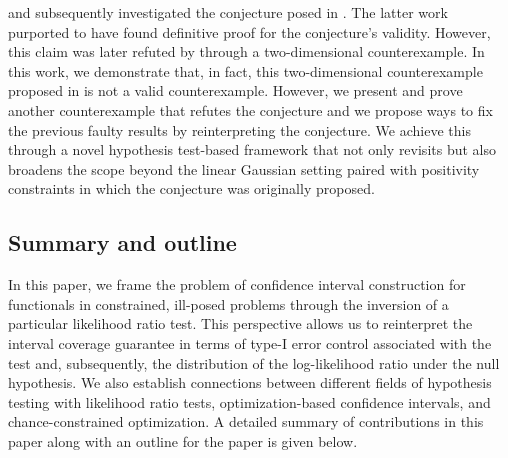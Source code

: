 \documentclass[11pt]{article}
\numberwithin{equation}{section}
\numberwithin{figure}{section}
\begin{document}
\cite{rust_burrus} and subsequently \cite{rust1994confidence} investigated the conjecture posed in \cite{burrus1965utilization}. 
The latter work purported to have found definitive proof for the conjecture's validity. 
However, this claim was later refuted by \cite{tenorio2007confidence} through a two-dimensional counterexample.
In this work, we demonstrate that, in fact, this two-dimensional counterexample proposed in \cite{tenorio2007confidence} is not a valid counterexample. 
However, we present and prove another counterexample that refutes the conjecture and we propose ways to fix the previous faulty results by reinterpreting the conjecture. 
We achieve this through a novel hypothesis test-based framework that not only revisits but also broadens the scope beyond the linear Gaussian setting paired with positivity constraints in which the conjecture was originally proposed.

\subsection{Summary and outline}

In this paper, we frame the problem of confidence interval construction for functionals in constrained, ill-posed problems through the inversion of a particular likelihood ratio test. 
This perspective allows us to reinterpret the interval coverage guarantee in terms of type-I error control associated with the test and, subsequently, the distribution of the log-likelihood ratio under the null hypothesis.
We also establish connections between different fields of hypothesis testing with likelihood ratio tests, optimization-based confidence intervals, and chance-constrained optimization.
A detailed summary of contributions in this paper along with an outline for the paper is given below.
\end{document}
